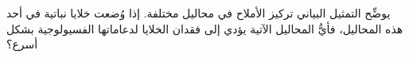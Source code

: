 
\begin{question}

\begin{instance}

\begin{mcq}[standalone=false]

\begin{stem}
يوضِّح التمثيل البياني تركيز الأملاح في محاليل مختلفة. إذا وُضعت خلايا نباتية في أحد هذه المحاليل، فأيُّ المحاليل الآتية يؤدي إلى فقدان الخلايا لدعاماتها الفسيولوجية بشكل أسرع؟\par
{}
\end{stem}

\begin{distractors}
        
\end{distractors}

\end{mcq}

\end{instance}

\end{question}
